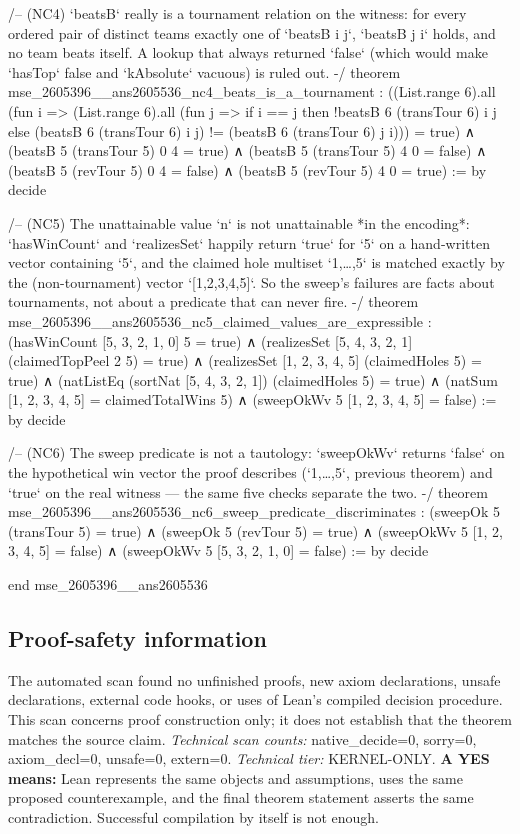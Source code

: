 \documentclass[11pt]{article}
\begin{document}
\begin{Vlean}
/-- (NC4) `beatsB` really is a tournament relation on the witness: for every ordered pair of
distinct teams exactly one of `beatsB i j`, `beatsB j i` holds, and no team beats itself.  A
lookup that always returned `false` (which would make `hasTop` false and `kAbsolute` vacuous)
is ruled out. -/
theorem mse_2605396__ans2605536_nc4_beats_is_a_tournament :
    ((List.range 6).all (fun i => (List.range 6).all (fun j =>
        if i == j then !beatsB 6 (transTour 6) i j
        else (beatsB 6 (transTour 6) i j) != (beatsB 6 (transTour 6) j i))) = true)
  ∧ (beatsB 5 (transTour 5) 0 4 = true)
  ∧ (beatsB 5 (transTour 5) 4 0 = false)
  ∧ (beatsB 5 (revTour 5) 0 4 = false)
  ∧ (beatsB 5 (revTour 5) 4 0 = true) := by decide

/-- (NC5) The unattainable value `n` is not unattainable *in the encoding*: `hasWinCount` and
`realizesSet` happily return `true` for `5` on a hand-written vector containing `5`, and the
claimed hole multiset `{1,…,5}` is matched exactly by the (non-tournament) vector
`[1,2,3,4,5]`.  So the sweep's failures are facts about tournaments, not about a predicate
that can never fire. -/
theorem mse_2605396__ans2605536_nc5_claimed_values_are_expressible :
    (hasWinCount [5, 3, 2, 1, 0] 5 = true)
  ∧ (realizesSet [5, 4, 3, 2, 1] (claimedTopPeel 2 5) = true)
  ∧ (realizesSet [1, 2, 3, 4, 5] (claimedHoles 5) = true)
  ∧ (natListEq (sortNat [5, 4, 3, 2, 1]) (claimedHoles 5) = true)
  ∧ (natSum [1, 2, 3, 4, 5] = claimedTotalWins 5)
  ∧ (sweepOkWv 5 [1, 2, 3, 4, 5] = false) := by decide

/-- (NC6) The sweep predicate is not a tautology: `sweepOkWv` returns `false` on the
hypothetical win vector the proof describes (`{1,…,5}`, previous theorem) and `true` on the
real witness — the same five checks separate the two. -/
theorem mse_2605396__ans2605536_nc6_sweep_predicate_discriminates :
    (sweepOk 5 (transTour 5) = true)
  ∧ (sweepOk 5 (revTour 5) = true)
  ∧ (sweepOkWv 5 [1, 2, 3, 4, 5] = false)
  ∧ (sweepOkWv 5 [5, 3, 2, 1, 0] = false) := by decide

end mse_2605396__ans2605536

\end{Vlean}
\subsection*{Proof-safety information}
The automated scan found no unfinished proofs, new axiom declarations, unsafe declarations, external code hooks, or uses of Lean's compiled decision procedure. This scan concerns proof construction only; it does not establish that the theorem matches the source claim.
\textit{Technical scan counts:} native\_decide=0, sorry=0, axiom\_decl=0, unsafe=0, extern=0. \textit{Technical tier:} KERNEL-ONLY.
\textbf{A YES means:} Lean represents the same objects and assumptions, uses the same proposed counterexample, and the final theorem statement asserts the same contradiction. Successful compilation by itself is not enough.
\clearpage
\end{document}
